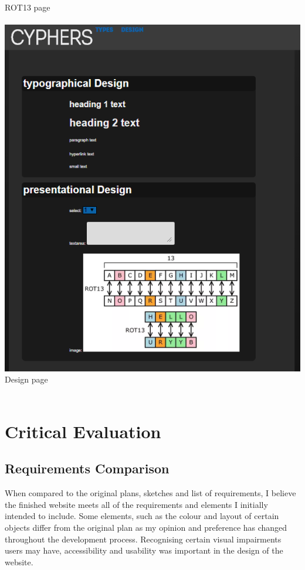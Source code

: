 \documentclass[10pt, a4paper]{article}
\begin{document}
	ROT13 page
	\\\\
	\includegraphics[scale=0.59]{design}
	Design page
	\\\\
	
	\section{Critical Evaluation}
    
	\subsection{Requirements Comparison}
	    When compared to the original plans, sketches and list of requirements, I believe the finished website meets all of the requirements and elements I initially intended to include. Some elements, such as the colour and layout of certain objects differ from the original plan as my opinion and preference has changed throughout the development process. Recognising certain visual impairments users may have, accessibility and usability was important in the design of the website.
\end{document}
